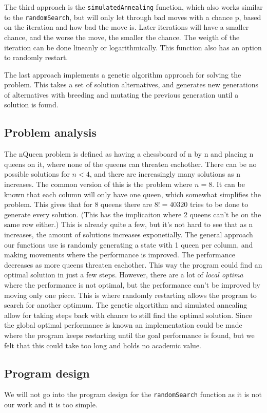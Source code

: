 \documentclass{article}
\begin{document}
The third approach is the \verb!simulatedAnnealing! function, which also works similar to the \verb!randomSearch!, but will only let through bad moves with a chance p, based on the iteration and how bad the move is. Later iterations will have a smaller chance, and the worse the move, the smaller the chance. The weigth of the iteration can be done lineanly or logarithmically. This function also has an option to randomly restart.

The last approach implements a genetic algorithm approach for solving the problem. This takes a set of solution alternatives, and generates new generations of alternatives with breeding and mutating the previous generation until a solution is found.
\subsection*{Problem analysis}

The nQueen problem is defined as having a chessboard of n by n and placing n queens on it, where none of the queens can threaten eachother. There can be no possible solutions for $n<4$, and there are increasingly many solutions as n increases. The common version of this is the problem where $n=8$. It can be known that each column will only have one queen, which somewhat simplifies the problem. This gives that for 8 queens there are $8! = 40320$ tries to be done to generate every solution. (This has the implicaiton where 2 queens can't be on the same row either.) This is already quite a few, but it's not hard to see that as n increases, the amount of solutions increases exponetially. The general approach our functions use is randomly generating a state with 1 queen per column, and making movements where the performance is improved. The performance decreases as more queens threaten eachother. This way the program could find an optimal solution in just a few steps. However, there are a lot of \textit{local optima} where the performance is not optimal, but the performance can't be improved by moving only one piece. This is where randomly restarting allows the program to search for another optimum. The genetic algortithm and simulated annealing allow for taking steps back with chance to still find the optimal solution. Since the global optimal performance is known an implementation could be made where the program keeps restarting until the goal performance is found, but we felt that this could take too long and holds no academic value.

\subsection*{Program design}
We will not go into the program design for the \verb!randomSearch! function as it is not our work and it is too simple.
\end{document}
